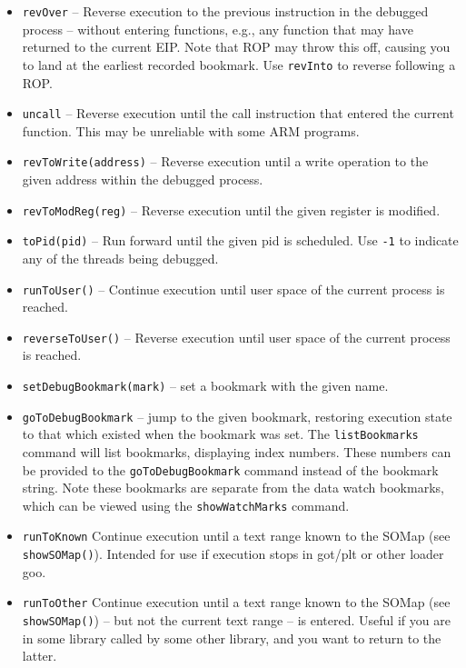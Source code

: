\documentclass[titlepage]{article}
\begin{document}
\begin{itemize}
\item {\tt revOver} – Reverse execution to the previous instruction in the debugged process – without entering functions, e.g., any function that may have returned to the current EIP.  Note that ROP may throw this off, causing you to land at the earliest recorded bookmark.  Use {\tt revInto} to reverse following a ROP.

\item {\tt uncall} – Reverse execution until the call instruction that entered the current function.  This may be unreliable with some ARM
programs.

\item {\tt revToWrite(address)} – Reverse execution until a write operation to the given address within the debugged process.

\item {\tt revToModReg(reg)} – Reverse execution until the given register is modified.


\item {\tt toPid(pid)} -- Run forward until the given pid is scheduled.  Use {\tt -1} to indicate any of the threads being debugged.

\item {\tt runToUser()} – Continue execution until user space of the current process is reached.

\item {\tt reverseToUser()} – Reverse execution until user space of the current process is reached.

\item {\tt setDebugBookmark(mark)} – set a bookmark with the given name.

\item {\tt goToDebugBookmark} – jump to the given bookmark, restoring execution state to that which existed when the bookmark was set.  The
{\tt listBookmarks} command will list bookmarks, displaying  index numbers.  These numbers can be provided to the {\tt goToDebugBookmark} command instead
of the bookmark string.  Note these bookmarks are separate from the data watch bookmarks, which can be viewed using the {\tt showWatchMarks} command.

\item {\tt runToKnown} Continue execution until a text range known to the SOMap (see {\tt showSOMap()}).  Intended for use if execution stops in got/plt 
or other loader goo.

\item {\tt runToOther} Continue execution until a text range known to the SOMap (see {\tt showSOMap()}) -- but not the current text range -- is entered.
Useful if you are in some library called by some other library, and you want to return to the latter.


\end{itemize}
\end{document}
